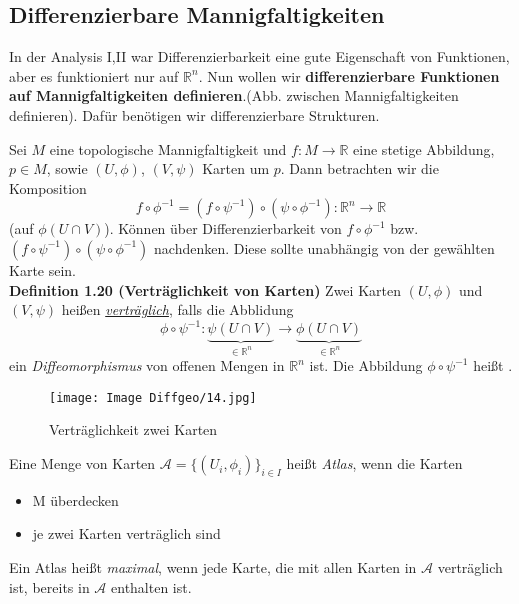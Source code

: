 \documentclass[fleqn, 12pt, letterpaper]{article}
\begin{document}
\subsection{Differenzierbare Mannigfaltigkeiten}

In der Analysis I,II war Differenzierbarkeit eine gute Eigenschaft von Funktionen, aber es funktioniert nur auf $\mathbb{R}^n$. Nun wollen wir \textbf{differenzierbare Funktionen auf Mannigfaltigkeiten definieren}.(Abb. zwischen Mannigfaltigkeiten definieren). Dafür benötigen wir differenzierbare Strukturen.

Sei $M$ eine topologische Mannigfaltigkeit und $f: M \to \mathbb{R}$ eine stetige Abbildung, $p \in M$, sowie $(U, \phi)$, $(V, \psi)$ Karten um $p$. Dann betrachten wir die Komposition
\[
f\circ \phi^{-1} = (f\circ\psi^{-1})\circ(\psi\circ\phi^{-1}) : \mathbb{R}^n \to \mathbb{R}
\]
(auf $\phi(U \cap V)$). Können über Differenzierbarkeit von $f\circ\phi^{-1}$ bzw. $(f\circ\psi^{-1})\circ(\psi\circ\phi^{-1})$ nachdenken.
 Diese sollte unabhängig von der gewählten Karte sein.\\

\textbf{Definition 1.20 (Verträglichkeit von Karten)}
Zwei Karten $(U, \phi)$ und $(V, \psi)$ heißen \underline{\emph{verträglich}}, falls die Abblidung
\[
\phi \circ \psi^{-1}: \underbrace{\psi(U \cap V)}_{\in \mathbb{R}^n} \to \underbrace{\phi(U \cap V)}_{\in \mathbb{R}^n}
\]
ein \emph{Diffeomorphismus} von offenen Mengen in $\mathbb{R}^n$ ist. Die Abbildung $\phi \circ \psi^{-1}$ heißt .

\begin{figure}[H]
  \centering
  \texttt{[image: Image Diffgeo/14.jpg]}
\caption{Verträglichkeit zwei Karten}
\end{figure}

Eine Menge von Karten $\mathcal{A} = \{(U_i, \phi_i)\}_{i\in I}$ heißt \emph{Atlas}, wenn die Karten \begin{itemize}
  \item M überdecken
  \item je zwei Karten verträglich sind
\end{itemize}

Ein Atlas heißt \emph{maximal}, wenn jede Karte, die mit allen Karten in $\mathcal{A}$ verträglich ist, bereits in $\mathcal{A}$ enthalten ist.\\
\end{document}
